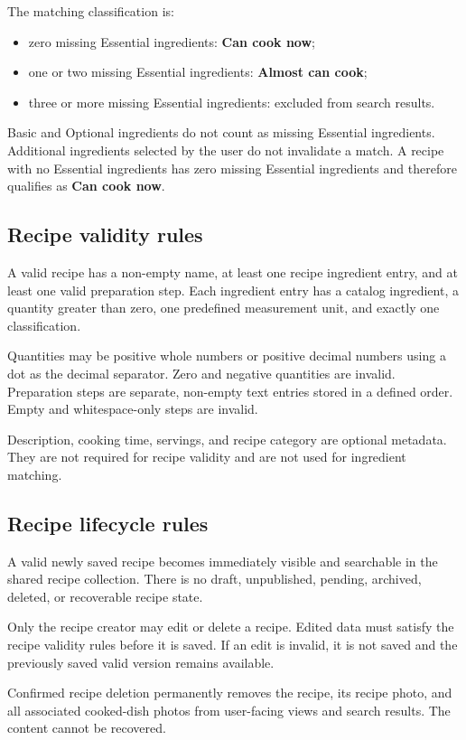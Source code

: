 \documentclass[12pt]{article}
\begin{document}
The matching classification is:
\begin{itemize}
    \item zero missing Essential ingredients: \textbf{Can cook now};
    \item one or two missing Essential ingredients: \textbf{Almost can cook};
    \item three or more missing Essential ingredients: excluded from search results.
\end{itemize}

Basic and Optional ingredients do not count as missing Essential ingredients. Additional ingredients selected by the user do not invalidate a match. A recipe with no Essential ingredients has zero missing Essential ingredients and therefore qualifies as \textbf{Can cook now}.

\subsection{Recipe validity rules}
A valid recipe has a non-empty name, at least one recipe ingredient entry, and at least one valid preparation step. Each ingredient entry has a catalog ingredient, a quantity greater than zero, one predefined measurement unit, and exactly one classification.

Quantities may be positive whole numbers or positive decimal numbers using a dot as the decimal separator. Zero and negative quantities are invalid. Preparation steps are separate, non-empty text entries stored in a defined order. Empty and whitespace-only steps are invalid.

Description, cooking time, servings, and recipe category are optional metadata. They are not required for recipe validity and are not used for ingredient matching.

\subsection{Recipe lifecycle rules}
A valid newly saved recipe becomes immediately visible and searchable in the shared recipe collection. There is no draft, unpublished, pending, archived, deleted, or recoverable recipe state.

Only the recipe creator may edit or delete a recipe. Edited data must satisfy the recipe validity rules before it is saved. If an edit is invalid, it is not saved and the previously saved valid version remains available.

Confirmed recipe deletion permanently removes the recipe, its recipe photo, and all associated cooked-dish photos from user-facing views and search results. The content cannot be recovered.
\end{document}

